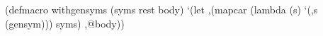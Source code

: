 (defmacro with\PYZhy{}gensyms (syms rest body)
  `(let ,(mapcar \PYZsh{}\PYZsq{}(lambda (s)
     `(,s (gensym)))
           syms)
         ,@body))
